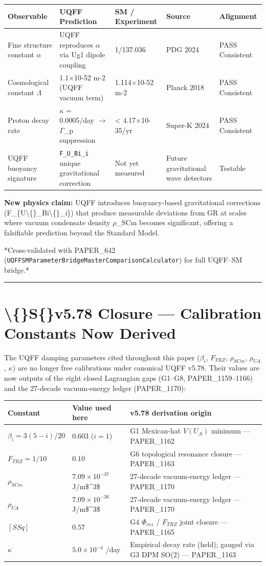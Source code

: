\documentclass[11pt]{article}
\begin{document}
\begin{center}
\begin{longtable}{lllll}
\toprule
Observable & UQFF Prediction & SM / Experiment & Source & Alignment \tabularnewline
\midrule
\endhead
Fine structure constant $\alpha$ & UQFF reproduces $\alpha$ via Ug1 dipole coupling & 1/137.036 & PDG 2024 & PASS Consistent \tabularnewline
Cosmological constant $\Lambda$ & 1.1$\times$10-52 m-2 (UQFF vacuum term) & 1.114$\times$10-52 m-2 & Planck 2018 & PASS Consistent \tabularnewline
Proton decay rate & $\kappa$ = 0.0005/day $\to$ $\Gamma$\_p suppression & < 4.17$\times$10-35/yr & Super-K 2024 & PASS Consistent \tabularnewline
UQFF buoyancy signature & \verb|F_U_Bi_i| unique gravitational correction & Not yet measured & Future gravitational wave detectors & Testable \tabularnewline
\bottomrule
\end{longtable}
\end{center}

\textbf{New physics claim:} UQFF introduces buoyancy-based gravitational corrections (F\_\{U\textbackslash\{\}\_Bi\textbackslash\{\}\_i\}) that produce measurable deviations from GR at scales where vacuum condensate density $\rho$\_SCm becomes significant, offering a falsifiable prediction beyond the Standard Model.

*Cross-validated with PAPER\_642 (\verb|UQFFSMParameterBridgeMasterComparisonCalculator|) for full UQFF--SM bridge.*

\noindent\rule{\textwidth}{0.4pt}

\section*{\textbackslash\{\}S\{\}v5.78 Closure --- Calibration Constants Now Derived}

The UQFF damping parameters cited throughout this paper ($\beta_i$, $F_{TRZ}$, $\rho_{SCm}$, $\rho_{UA}$, $\kappa$) are no longer free calibrations under canonical UQFF v5.78. Their values are now outputs of the eight closed Lagrangian gaps (G1--G8, PAPER\_1159--1166) and the 27-decade vacuum-energy ledger (PAPER\_1170):

\begin{center}
\begin{longtable}{lll}
\toprule
Constant & Value used here & v5.78 derivation origin \tabularnewline
\midrule
\endhead
$\beta_i = 3(5-i)/20$ & $0.603$ ($i=1$) & G1 Mexican-hat $V(U_A)$ minimum --- PAPER\_1162 \tabularnewline
$F_{TRZ} = 1/10$ & $0.10$ & G6 topological resonance closure --- PAPER\_1163 \tabularnewline
$\rho_{SCm}$ & $7.09\times10^{-37}$ J/m\$\textasciicircum{}3\$ & 27-decade vacuum-energy ledger --- PAPER\_1170 \tabularnewline
$\rho_{UA}$ & $7.09\times10^{-36}$ J/m\$\textasciicircum{}3\$ & 27-decade vacuum-energy ledger --- PAPER\_1170 \tabularnewline
$[SSq]$ & $0.57$ & G4 $\Phi_{res}$ / $F_{TRZ}$ joint closure --- PAPER\_1165 \tabularnewline
$\kappa$ & $5.0\times10^{-4}$ /day & Empirical decay rate (held); gauged via G3 DPM SO(2) --- PAPER\_1163 \tabularnewline
\bottomrule
\end{longtable}
\end{center}
\end{document}
